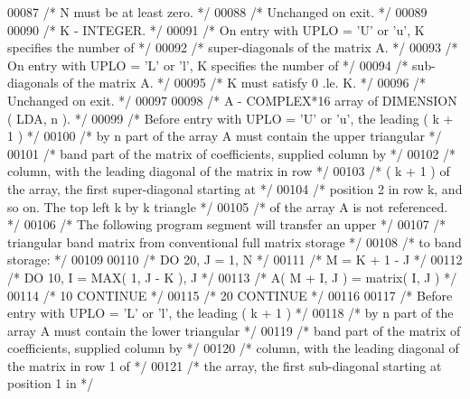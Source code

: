 \begin{DoxyCode}
00087 \textcolor{comment}{/*           N must be at least zero. */}
00088 \textcolor{comment}{/*           Unchanged on exit. */}
00089 
00090 \textcolor{comment}{/*  K      - INTEGER. */}
00091 \textcolor{comment}{/*           On entry with UPLO = 'U' or 'u', K specifies the number of */}
00092 \textcolor{comment}{/*           super-diagonals of the matrix A. */}
00093 \textcolor{comment}{/*           On entry with UPLO = 'L' or 'l', K specifies the number of */}
00094 \textcolor{comment}{/*           sub-diagonals of the matrix A. */}
00095 \textcolor{comment}{/*           K must satisfy  0 .le. K. */}
00096 \textcolor{comment}{/*           Unchanged on exit. */}
00097 
00098 \textcolor{comment}{/*  A      - COMPLEX*16       array of DIMENSION ( LDA, n ). */}
00099 \textcolor{comment}{/*           Before entry with UPLO = 'U' or 'u', the leading ( k + 1 ) */}
00100 \textcolor{comment}{/*           by n part of the array A must contain the upper triangular */}
00101 \textcolor{comment}{/*           band part of the matrix of coefficients, supplied column by */}
00102 \textcolor{comment}{/*           column, with the leading diagonal of the matrix in row */}
00103 \textcolor{comment}{/*           ( k + 1 ) of the array, the first super-diagonal starting at */}
00104 \textcolor{comment}{/*           position 2 in row k, and so on. The top left k by k triangle */}
00105 \textcolor{comment}{/*           of the array A is not referenced. */}
00106 \textcolor{comment}{/*           The following program segment will transfer an upper */}
00107 \textcolor{comment}{/*           triangular band matrix from conventional full matrix storage */}
00108 \textcolor{comment}{/*           to band storage: */}
00109 
00110 \textcolor{comment}{/*                 DO 20, J = 1, N */}
00111 \textcolor{comment}{/*                    M = K + 1 - J */}
00112 \textcolor{comment}{/*                    DO 10, I = MAX( 1, J - K ), J */}
00113 \textcolor{comment}{/*                       A( M + I, J ) = matrix( I, J ) */}
00114 \textcolor{comment}{/*              10    CONTINUE */}
00115 \textcolor{comment}{/*              20 CONTINUE */}
00116 
00117 \textcolor{comment}{/*           Before entry with UPLO = 'L' or 'l', the leading ( k + 1 ) */}
00118 \textcolor{comment}{/*           by n part of the array A must contain the lower triangular */}
00119 \textcolor{comment}{/*           band part of the matrix of coefficients, supplied column by */}
00120 \textcolor{comment}{/*           column, with the leading diagonal of the matrix in row 1 of */}
00121 \textcolor{comment}{/*           the array, the first sub-diagonal starting at position 1 in */}

\end{DoxyCode}
